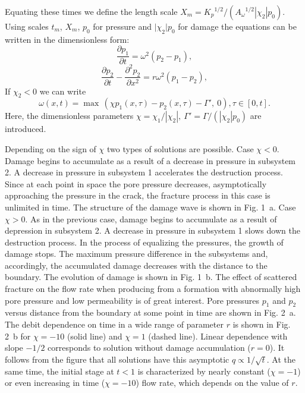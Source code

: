\documentclass[article,authoryear,jpm]{beg_39}             %
\begin{document}
Equating these times we define the length scale ${{X}_{m}}={{K}_{p}}^{1/2}/({{A}_{\omega }}^{1/2}{|{\chi }_{2}|}{{p}_{0}})$. Using scales ${t}_{m}$,  ${X}_{m}$, $p_0$ for pressure and ${|\chi }_{2}|{{p}_{0}}$ for damage the equations can be written in the dimensionless form:
\begin{equation}
\frac{\partial {{p}_{1}}}{\partial t}={{\omega }^{2}}({{p}_{2}}-{{p}_{1}}),
\end{equation}
\begin{equation}
\frac{\partial {{p}_{2}}}{\partial t}-\frac{{{\partial }^{2}}{{p}_{2}}}{\partial {{x}^{2}}}=r{{\omega }^{2}}({{p}_{1}}-{{p}_{2}}),
\end{equation}
If ${{\chi}_{2}}< 0$ we can write
\begin{equation}
\omega (x,t)={\mathop{\max }}\,\left(  \chi {{p}_{1}}(x,\tau )-{{p}_{2}}(x,\tau )-{\Gamma }',\ 0 \right), \tau \in [0,t].
\end{equation}
Here, the dimensionless parameters $\chi ={{\chi }_{1}}/{|{\chi }_{2}|},\ {\Gamma }'=\Gamma /({|{\chi }_{2}|}{{p}_{0}})$ are introduced.

Depending on the sign of $\chi$ two types of solutions are possible.
Case $\chi<0$.
Damage begins to accumulate as a result of a decrease in pressure in subsystem 2. A decrease in pressure in subsystem 1 accelerates the destruction process. Since at each point in space the pore pressure decreases, asymptotically approaching the pressure in the crack, the fracture process in this case is unlimited in time.
The structure of the damage wave is shown in Fig. 1~a.
Case $\chi>0$.
As in the previous case, damage begins to accumulate as a result of depression in subsystem 2. A decrease in pressure in subsystem 1 slows down the destruction process. In the process of equalizing the pressures, the growth of damage stops. The maximum pressure difference in the subsystems and, accordingly, the accumulated damage decreases with the distance to the boundary.
The evolution of damage is shown in Fig. 1~b.
The effect of scattered fracture on the flow rate when producing from a formation with abnormally high pore pressure and low permeability is of great interest.  Pore pressures $p_1$ and $p_2$ versus distance from the boundary at some point in time are shown in Fig. 2~a. 
The debit dependence on time in a wide range of parameter $r$ is shown in Fig. 2~b for $\chi=-10$ (solid line) and $\chi=1$ (dashed line). Linear dependence with slope $-1/2$ corresponds to solution without damage accumulation ($r=0$). It follows from the figure that all solutions have this asymptotic $q \propto 1/\sqrt{t}$. At the same time, the initial stage at $t < 1$ is characterized by nearly constant ($\chi=-1$) or even increasing in time ($\chi=-10$) flow rate, which depends on the value of $r$.
\end{document}

